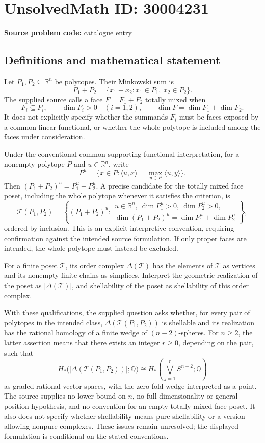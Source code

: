 \documentclass[11pt]{article}
\newcommand{\Q}{\mathbb{Q}}
\newcommand{\R}{\mathbb{R}}
\begin{document}
\section*{UnsolvedMath ID: 30004231}
\textbf{Source problem code:} catalogue entry
\subsection{Definitions and mathematical statement}
Let \(P_1,P_2\subseteq\R^n\) be polytopes. Their Minkowski sum is
\[
P_1+P_2=\{x_1+x_2:x_1\in P_1,\ x_2\in P_2\}.
\]
The supplied source calls a face \(F=F_1+F_2\) totally mixed when
\[
F_i\subseteq P_i,\qquad \dim F_i>0\quad(i=1,2),\qquad
\dim F=\dim F_1+\dim F_2.
\]
It does not explicitly specify whether the summands \(F_i\) must be faces exposed by a common linear functional, or whether the whole polytope is included among the faces under consideration.

Under the conventional common-supporting-functional interpretation, for a nonempty polytope \(P\) and \(u\in\R^n\), write
\[
P^u=\{x\in P:\langle u,x\rangle=\max_{y\in P}\langle u,y\rangle\}.
\]
Then \((P_1+P_2)^u=P_1^u+P_2^u\). A precise candidate for the totally mixed face poset, including the whole polytope whenever it satisfies the criterion, is
\[
\mathcal T(P_1,P_2)=\left\{(P_1+P_2)^u:
\begin{array}{l}
u\in\R^n,\ \dim P_1^u>0,\ \dim P_2^u>0,\\
\dim (P_1+P_2)^u=\dim P_1^u+\dim P_2^u
\end{array}\right\},
\]
ordered by inclusion. This is an explicit interpretive convention, requiring confirmation against the intended source formulation. If only proper faces are intended, the whole polytope must instead be excluded.

For a finite poset \(\mathcal T\), its order complex \(\Delta(\mathcal T)\) has the elements of \(\mathcal T\) as vertices and its nonempty finite chains as simplices. Interpret the geometric realization of the poset as \(|\Delta(\mathcal T)|\), and shellability of the poset as shellability of this order complex.

With these qualifications, the supplied question asks whether, for every pair of polytopes in the intended class, \(\Delta(\mathcal T(P_1,P_2))\) is shellable and its realization has the rational homology of a finite wedge of \((n-2)\)-spheres. For \(n\geq2\), the latter assertion means that there exists an integer \(r\geq0\), depending on the pair, such that
\[
H_*\bigl(|\Delta(\mathcal T(P_1,P_2))|;\Q\bigr)
\cong
H_*\left(\bigvee_{j=1}^{r}S^{n-2};\Q\right)
\]
as graded rational vector spaces, with the zero-fold wedge interpreted as a point. The source supplies no lower bound on \(n\), no full-dimensionality or general-position hypothesis, and no convention for an empty totally mixed face poset. It also does not specify whether shellability means pure shellability or a version allowing nonpure complexes. These issues remain unresolved; the displayed formulation is conditional on the stated conventions.
\end{document}
